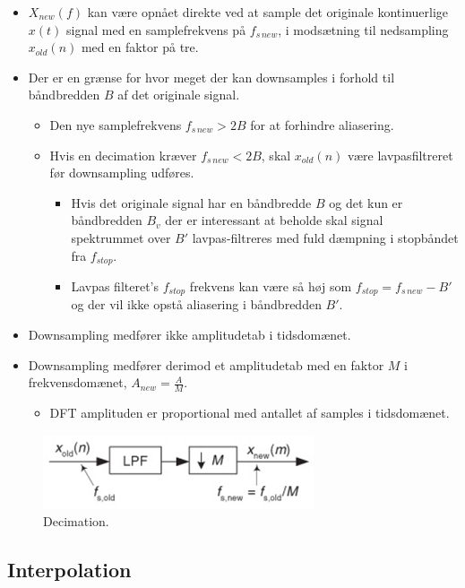 \documentclass[danish]{article}
\begin{document}
\begin{itemize}
	\item $X_{new}(f)$ kan være opnået direkte ved at sample det originale kontinuerlige $x(t)$ signal med en samplefrekvens på $f_{s\, new}$, i modsætning til nedsampling $x_{old}(n)$ med en faktor på tre.
	\item Der er en grænse for hvor meget der kan downsamples i forhold til båndbredden $B$ af det originale signal.
	\begin{itemize}
		\item 	Den nye samplefrekvens $f_{s\, new} > 2B$ for at forhindre aliasering.
		\item Hvis en decimation kræver $f_{s\, new} < 2B$, skal $x_{old}(n)$ være lavpasfiltreret før downsampling udføres.
		\begin{itemize}
			\item Hvis det originale signal har en båndbredde $B$ og det kun er båndbredden $B_v$ der er interessant at beholde skal signal spektrummet over $B'$ lavpas-filtreres med fuld dæmpning i stopbåndet fra $f_{stop}$.
			\item  Lavpas filteret's $f_{stop}$ frekvens kan være så høj som $f_{stop} = f_{s\,new} -B'$ og der vil ikke opstå aliasering i båndbredden $B'$.
		\end{itemize}
	\end{itemize}
		\item Downsampling medfører ikke amplitudetab i tidsdomænet.
		\item Downsampling medfører derimod et amplitudetab med en faktor $M$ i frekvensdomænet, $A_{new} = \frac{A}{M}$.
		\begin{itemize}
			\item DFT amplituden er proportional med antallet af samples i tidsdomænet.
		\end{itemize}
\end{itemize}

\begin{figure}[H]
	\centering
	\includegraphics[width=0.4\linewidth]{graphics/decimation2}
	\caption{Decimation.}
	\label{fig:decimation2}
\end{figure}


\subsection{Interpolation}
\end{document}
